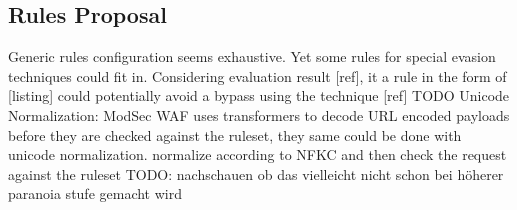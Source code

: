 \subsection{Rules Proposal}
Generic rules configuration seems exhaustive. Yet some rules for special evasion techniques could fit in. Considering evaluation result [ref], it a rule in the form of [listing] could potentially avoid a bypass using the technique [ref]{\color{red} TODO}
Unicode Normalization: ModSec WAF uses transformers to decode URL encoded payloads before they are checked against the ruleset, they same could be done with unicode normalization. normalize according to NFKC and then check the request against the ruleset {\color{red} TODO: nachschauen ob das vielleicht nicht schon bei höherer paranoia stufe gemacht wird}
